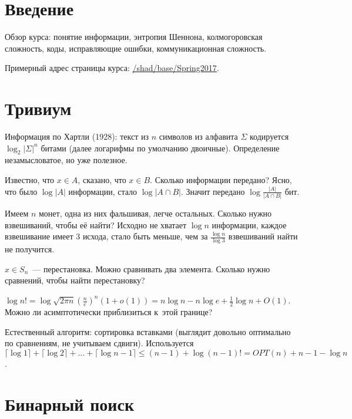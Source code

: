 \documentclass{article}
\begin{document}
\section{Введение}

Обзор курса: понятие информации, энтропия Шеннона, колмогоровская сложность,
коды, исправляющие ошибки, коммуникационная сложность.

Примерный адрес страницы курса: \url{/shad/base/Spring2017}.

\section{Тривиум}

Информация по Хартли (1928): текст из $n$ символов из алфавита $\Sigma$
кодируется $\log_2 |\Sigma|^n$ битами (далее логарифмы по умолчанию двоичные).
Определение незамысловатое, но уже полезное.

\begin{example}
	Известно, что $x \in A$, сказано, что $x \in B$. Сколько информации передано?
	Ясно, что было $\log |A|$ информации, стало $\log |A \cap B|$. Значит передано
	$\log \frac{|A|}{|A \cap B|}$ бит.
\end{example}

\begin{example}
	Имеем $n$ монет, одна из них фальшивая, легче остальных. Сколько нужно
	взвешиваний, чтобы её найти? Исходно не хватает $\log n$ информации, каждое
	взвешивание имеет 3 исхода, стало быть меньше, чем за $\frac{\log n}{\log 3}$
	взвешиваний найти не получится.
\end{example}

\begin{example}
	$x \in S_n$~--- перестановка. Можно сравнивать два элемента. Сколько нужно
	сравнений, чтобы найти перестановку?

	$\log n! = \log \sqrt{2\pi n}\left(\frac{n}{e}\right)^n (1 + o(1)) =
	n \log n - n \log e + \frac{1}{2} \log n + O(1)$. Можно ли асимптотически
	приблизиться к~этой границе?

	Естественный алгоритм: сортировка вставками (выглядит довольно оптимально по
	сравнениям, не учитываем сдвиги). Используется $\lceil \log 1 \rceil + \lceil
	\log 2 \rceil + \ldots + \lceil \log n - 1 \rceil \le (n - 1) + \log (n - 1)!
	= OPT(n) + n - 1 - \log n$.
\end{example}

\section{Бинарный поиск}
\end{document}
